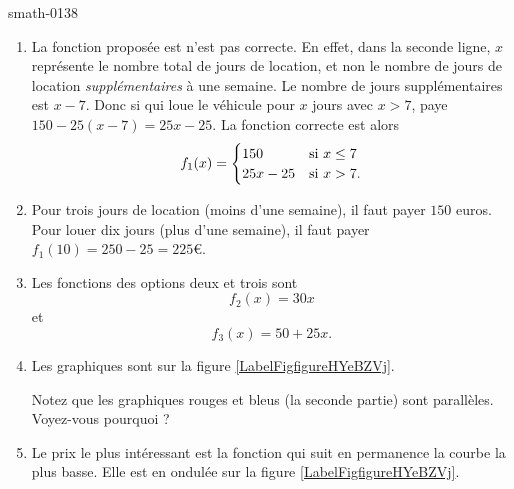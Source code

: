 
\begin{corrige}{smath-0138}

    \begin{enumerate}
        \item
            La fonction proposée est n'est pas correcte. En effet, dans la seconde ligne, \( x\) représente le nombre total de jours de location, et non le nombre de jours de location \emph{supplémentaires} à une semaine. Le nombre de jours supplémentaires est \( x-7\). Donc si qui loue le véhicule pour \( x\) jours avec \( x>7\), paye \( 150-25(x-7)=25x-25\). La fonction correcte est alors
            \begin{equation}
                f_1(x)=\begin{cases}
                    150    &   \text{si \( x\leq 7\)}\\
                    25x-25    &    \text{si \( x>7\)}.
                \end{cases}
            \end{equation}
        \item
            Pour trois jours de location (moins d'une semaine), il faut payer \( 150\) euros. Pour louer dix jours (plus d'une semaine), il faut payer \( f_1(10)=250-25=225\)€.
        \item
            Les fonctions des options deux et trois sont
            \begin{equation}
                f_2(x)=30x
            \end{equation}
            et
            \begin{equation}
                f_3(x)=50+25x.
            \end{equation}
            
        \item
            Les graphiques sont sur la figure \ref{LabelFigfigureHYeBZVj}. %
\newcommand{\CaptionFigfigureHYeBZVj}{Les prix comparés des différentes options de location pour l'exercice \ref{exosmath-0138}.}


Notez que les graphiques rouges et bleus (la seconde partie) sont parallèles. Voyez-vous pourquoi ?
        \item
            Le prix le plus intéressant est la fonction qui suit en permanence la courbe la plus basse. Elle est en ondulée sur la figure \ref{LabelFigfigureHYeBZVj}.

    \end{enumerate}

\end{corrige}
